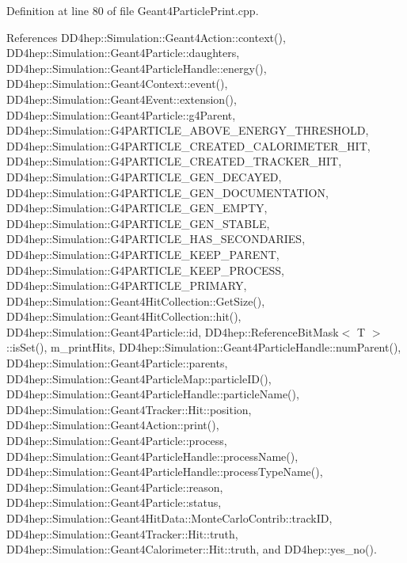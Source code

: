Definition at line 80 of file Geant4\+Particle\+Print.\+cpp.



References D\+D4hep\+::\+Simulation\+::\+Geant4\+Action\+::context(), D\+D4hep\+::\+Simulation\+::\+Geant4\+Particle\+::daughters, D\+D4hep\+::\+Simulation\+::\+Geant4\+Particle\+Handle\+::energy(), D\+D4hep\+::\+Simulation\+::\+Geant4\+Context\+::event(), D\+D4hep\+::\+Simulation\+::\+Geant4\+Event\+::extension(), D\+D4hep\+::\+Simulation\+::\+Geant4\+Particle\+::g4\+Parent, D\+D4hep\+::\+Simulation\+::\+G4\+P\+A\+R\+T\+I\+C\+L\+E\+\_\+\+A\+B\+O\+V\+E\+\_\+\+E\+N\+E\+R\+G\+Y\+\_\+\+T\+H\+R\+E\+S\+H\+O\+LD, D\+D4hep\+::\+Simulation\+::\+G4\+P\+A\+R\+T\+I\+C\+L\+E\+\_\+\+C\+R\+E\+A\+T\+E\+D\+\_\+\+C\+A\+L\+O\+R\+I\+M\+E\+T\+E\+R\+\_\+\+H\+IT, D\+D4hep\+::\+Simulation\+::\+G4\+P\+A\+R\+T\+I\+C\+L\+E\+\_\+\+C\+R\+E\+A\+T\+E\+D\+\_\+\+T\+R\+A\+C\+K\+E\+R\+\_\+\+H\+IT, D\+D4hep\+::\+Simulation\+::\+G4\+P\+A\+R\+T\+I\+C\+L\+E\+\_\+\+G\+E\+N\+\_\+\+D\+E\+C\+A\+Y\+ED, D\+D4hep\+::\+Simulation\+::\+G4\+P\+A\+R\+T\+I\+C\+L\+E\+\_\+\+G\+E\+N\+\_\+\+D\+O\+C\+U\+M\+E\+N\+T\+A\+T\+I\+ON, D\+D4hep\+::\+Simulation\+::\+G4\+P\+A\+R\+T\+I\+C\+L\+E\+\_\+\+G\+E\+N\+\_\+\+E\+M\+P\+TY, D\+D4hep\+::\+Simulation\+::\+G4\+P\+A\+R\+T\+I\+C\+L\+E\+\_\+\+G\+E\+N\+\_\+\+S\+T\+A\+B\+LE, D\+D4hep\+::\+Simulation\+::\+G4\+P\+A\+R\+T\+I\+C\+L\+E\+\_\+\+H\+A\+S\+\_\+\+S\+E\+C\+O\+N\+D\+A\+R\+I\+ES, D\+D4hep\+::\+Simulation\+::\+G4\+P\+A\+R\+T\+I\+C\+L\+E\+\_\+\+K\+E\+E\+P\+\_\+\+P\+A\+R\+E\+NT, D\+D4hep\+::\+Simulation\+::\+G4\+P\+A\+R\+T\+I\+C\+L\+E\+\_\+\+K\+E\+E\+P\+\_\+\+P\+R\+O\+C\+E\+SS, D\+D4hep\+::\+Simulation\+::\+G4\+P\+A\+R\+T\+I\+C\+L\+E\+\_\+\+P\+R\+I\+M\+A\+RY, D\+D4hep\+::\+Simulation\+::\+Geant4\+Hit\+Collection\+::\+Get\+Size(), D\+D4hep\+::\+Simulation\+::\+Geant4\+Hit\+Collection\+::hit(), D\+D4hep\+::\+Simulation\+::\+Geant4\+Particle\+::id, D\+D4hep\+::\+Reference\+Bit\+Mask$<$ T $>$\+::is\+Set(), m\+\_\+print\+Hits, D\+D4hep\+::\+Simulation\+::\+Geant4\+Particle\+Handle\+::num\+Parent(), D\+D4hep\+::\+Simulation\+::\+Geant4\+Particle\+::parents, D\+D4hep\+::\+Simulation\+::\+Geant4\+Particle\+Map\+::particle\+I\+D(), D\+D4hep\+::\+Simulation\+::\+Geant4\+Particle\+Handle\+::particle\+Name(), D\+D4hep\+::\+Simulation\+::\+Geant4\+Tracker\+::\+Hit\+::position, D\+D4hep\+::\+Simulation\+::\+Geant4\+Action\+::print(), D\+D4hep\+::\+Simulation\+::\+Geant4\+Particle\+::process, D\+D4hep\+::\+Simulation\+::\+Geant4\+Particle\+Handle\+::process\+Name(), D\+D4hep\+::\+Simulation\+::\+Geant4\+Particle\+Handle\+::process\+Type\+Name(), D\+D4hep\+::\+Simulation\+::\+Geant4\+Particle\+::reason, D\+D4hep\+::\+Simulation\+::\+Geant4\+Particle\+::status, D\+D4hep\+::\+Simulation\+::\+Geant4\+Hit\+Data\+::\+Monte\+Carlo\+Contrib\+::track\+ID, D\+D4hep\+::\+Simulation\+::\+Geant4\+Tracker\+::\+Hit\+::truth, D\+D4hep\+::\+Simulation\+::\+Geant4\+Calorimeter\+::\+Hit\+::truth, and D\+D4hep\+::yes\+\_\+no().



